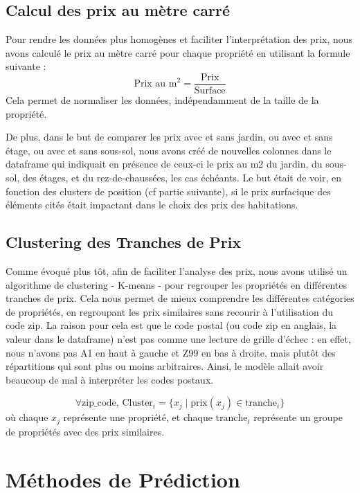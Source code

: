 \documentclass[a4paper,12pt,french]{article}
\begin{document}
\subsection{Calcul des prix au mètre carré}
Pour rendre les données plus homogènes et faciliter l'interprétation des prix, nous avons calculé le prix au mètre carré pour chaque propriété en utilisant la formule suivante :
\[
\text{Prix au m}^2 = \frac{\text{Prix}}{\text{Surface}}
\]
Cela permet de normaliser les données, indépendamment de la taille de la propriété.

De plus, dans le but de comparer les prix avec et sans jardin, ou avec et sans étage, ou avec et sans sous-sol, nous avons créé de nouvelles colonnes dans le dataframe qui indiquait en présence de ceux-ci le prix au m2 du jardin, du sous-sol, des étages, et du rez-de-chaussées, les cas échéants. Le but était de voir, en fonction des clusters de position (cf partie suivante), si le prix surfacique des éléments cités était impactant dans le choix des prix des habitations.

\subsection{Clustering des Tranches de Prix}
Comme évoqué plus tôt, afin de faciliter l'analyse des prix, nous avons utilisé un algorithme de clustering - K-means - pour regrouper les propriétés en différentes tranches de prix. Cela nous permet de mieux comprendre les différentes catégories de propriétés, en regroupant les prix similaires sans recourir à l'utilisation du code zip. La raison pour cela est que le code postal (ou code zip en anglais, la valeur dans le dataframe) n'est pas comme une lecture de grille d'échec : en effet, nous n'avons pas A1 en haut à gauche et Z99 en bas à droite, mais plutôt des répartitions qui sont plus ou moins arbitraires. Ainsi, le modèle allait avoir beaucoup de mal à interpréter les codes postaux.

\[
\forall \text{zip\_code, } \text{Cluster}_i = \{ x_j \mid \text{prix}(x_j) \in \text{tranche}_i \}
\]
où chaque \( x_j \) représente une propriété, et chaque \( \text{tranche}_i \) représente un groupe de propriétés avec des prix similaires.

\newpage

\section{Méthodes de Prédiction}
\end{document}
